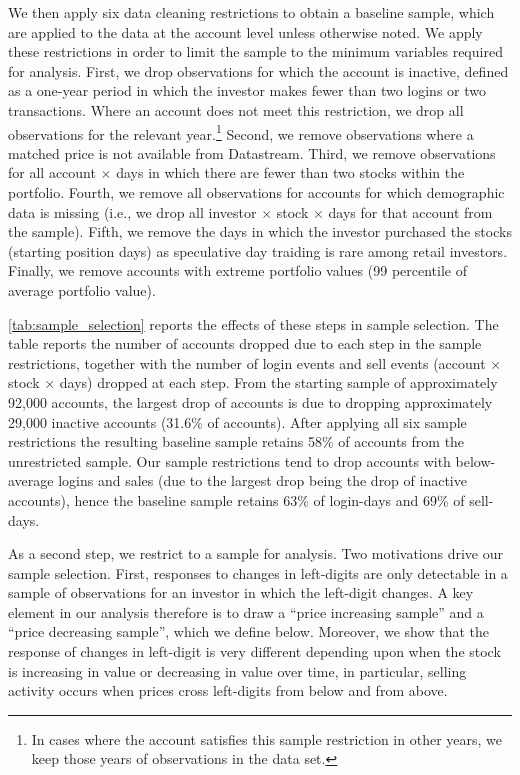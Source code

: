 We then apply six data cleaning restrictions to obtain a baseline sample, which are applied to the data at the account level unless otherwise noted. We apply these restrictions in order to limit the sample to the minimum variables required for analysis. First, we drop observations for which the account is inactive, defined as a one-year period in which the investor makes fewer than two logins or two transactions. Where an account does not meet this restriction, we drop all observations for the relevant year.\footnote{In cases where the account satisfies this sample restriction in other years, we keep those years of observations in the data set.} Second, we remove observations where a matched price is not available from Datastream. Third, we remove observations for all account $\times$ days in which there are fewer than two stocks within the portfolio.  Fourth, we remove all observations for accounts for which demographic data is missing (i.e., we drop all investor $\times$ stock $\times$ days for that account from the sample). Fifth, we remove the days in which the investor purchased the stocks (starting position days) as speculative day traiding is rare among retail investors. Finally, we remove accounts with extreme portfolio values (99 percentile of average portfolio value).

\ref{tab:sample_selection} reports the effects of these steps in sample selection. The table reports the number of accounts dropped due to each step in the sample restrictions, together with the number of login events and sell events (account $\times$ stock $\times$ days) dropped at each step. From the starting sample of approximately 92,000 accounts, the largest drop of accounts is due to dropping approximately 29,000 inactive accounts (31.6\% of accounts). After applying all six sample restrictions the resulting baseline sample retains 58\% of accounts from the unrestricted sample. Our sample restrictions tend to drop accounts with below-average logins and sales (due to the largest drop being the drop of inactive accounts), hence the baseline sample retains 63\% of login-days and 69\% of sell-days. 

As a second step, we restrict to a sample for analysis. Two motivations drive our sample selection. First, responses to changes in left-digits are only detectable in a sample of observations for an investor in which the left-digit changes.  A key element in our analysis therefore is to draw a ``price increasing sample'' and a ``price decreasing sample'', which we define below. Moreover, we show that the response of changes in left-digit is very different depending upon when the stock is increasing in value or decreasing in value over time, in particular, selling activity occurs when prices cross left-digits from below and from above.

